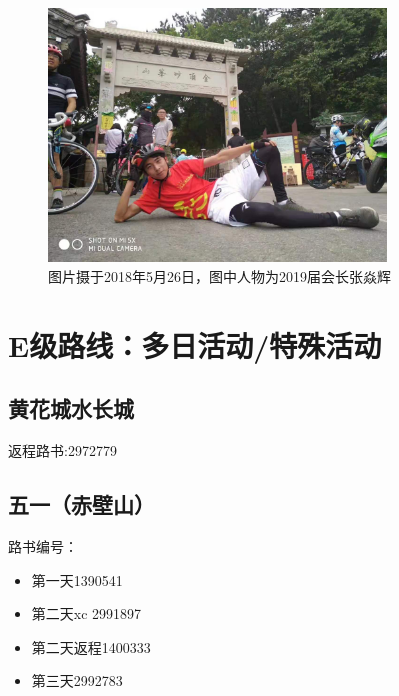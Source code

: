 \documentclass{ctexbook}
\begin{document}
\begin{figure}[ht]
    \centering
    \includegraphics[width=0.8\textwidth]{fig/妙峰山1.jpg}
    \caption{图片摄于2018年5月26日，图中人物为2019届会长张焱辉}
\end{figure}

\section{E级路线：多日活动/特殊活动}
\subsection{黄花城水长城}
返程路书:2972779


\subsection{五一（赤壁山）}
路书编号：
\begin{itemize}
    \item 第一天1390541
    \item 第二天xc 2991897
    \item 第二天返程1400333
    \item 第三天2992783
\end{itemize}
\end{document}
